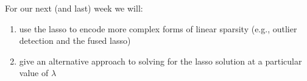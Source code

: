 \begin{frame}[fragile] \frametitle{}

For our next (and last) week we will:
\begin{enumerate}
\item use the lasso to encode more complex forms of linear sparsity (e.g., outlier
detection and the fused lasso)
\item give an alternative approach to solving for the lasso solution at
a particular value of $\lambda$
\end{enumerate}

\end{frame}













